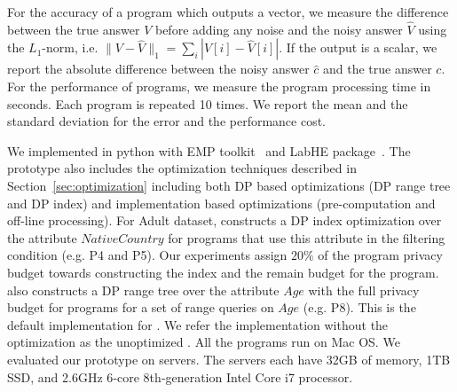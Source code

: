 For the accuracy of a program which outputs a vector, we measure the difference between the true answer $V$ before adding any noise and the noisy answer $\hat{V}$ using the $L_1$-norm, i.e. $\|V-\hat{V}\|_1 = \sum_{i} |V[i]-\hat{V}[i]|$. If the output is a scalar, we report the absolute difference between the noisy answer $\hat{c}$ and the true answer $c$. For the performance of \system programs, we measure the program processing time in seconds. Each program is repeated 10 times. We report the mean and the standard deviation for the error and the performance cost.

 We implemented \system in python with EMP toolkit~\cite{} and LabHE package~\cite{}. The prototype also includes the optimization techniques described in Section~\ref{sec:optimization} including both DP based optimizations (DP range tree and DP index) and implementation based optimizations (pre-computation and off-line processing). For Adult dataset, \system constructs a DP index optimization over the attribute $NativeCountry$ for programs that use this attribute in the filtering condition (e.g. P4 and P5). Our experiments assign $20\%$ of the program privacy budget towards constructing the index and the remain budget for the program. \system also constructs a DP range tree over the attribute $Age$ with the full privacy budget for programs for a set of range queries on $Age$ (e.g. P8). This is the default implementation for \system.  We refer the implementation without the optimization as the unoptimized \system.
All the programs run on Mac OS. We evaluated our prototype on  servers. The servers each have  32GB of memory, 1TB SSD, and 2.6GHz 6‑core 8th‑generation Intel Core i7 processor.





